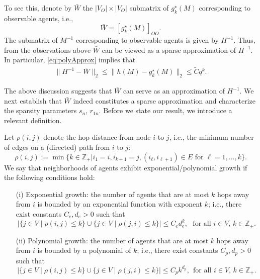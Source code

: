 \documentclass[opre,nonblindrev]{informs3} %
\begin{document}
To see this, denote by  $\bar W$ the $|V_O| \times |V_O|$ submatrix
of $g^\star_k(M)$ corresponding to observable agents, i.e.,
\begin{equation} \label{eq:ex3barW}
\bar W = [g^\star_k(M)]_{OO}.
\end{equation}
The submatrix of $M^{-1}$ corresponding to observable agents is given by $H^{-1}$. Thus, from the observations above $\bar W$ can be viewed as a sparse approximation of $H^{-1}$. In particular, \eqref{eq:polyApprox} implies that
\begin{equation} \label{eq:polyApproxHinv}
\begin{aligned}
\|  H^{-1} - \bar{W}\|_2 \leq
\| h(M) - g_k^\star(M) \|_2
\leq \tilde{C}
q^k.
\end{aligned}
\end{equation}




The above discussion  suggests that $\bar W$ can serve as an approximation  of $H^{-1}$.
We next  establish that
$\bar W$ indeed  constitutes a sparse approximation and characterize the sparsity parameters $s_n$, $r_{1n}$.
Before we state our result, we introduce a relevant definition.

\begin{definition}
	Let  $\rho(i,j)$ denote the hop distance from node $i$ to $j$, i.e.,
	  the minimum number of edges on a (directed) path from $i$ to $j$:
	$$\rho(i,j) :=\min  \{ k\in \mathbb{Z}_{+}|   i_1=i, i_{k+1}=j,  (i_\ell,i_{\ell+1})\in E \mbox{ for $\ell=1,\dots,k$} \}.$$
	We say that neighborhoods
	of  agents
	exhibit exponential/polynomial growth if  the following conditions hold:
	\begin{itemize}
		\item[(i)] Exponential growth: the number of agents that are at most $k$ hops away from $i$ is bounded by an exponential function with exponent $k$; i.e., there exist constants $C_e, d_e>0$ such that 
		$$|\{ j\in V \mid \rho(i,j)  \leq  k \}  \cup \{ j\in V \mid \rho(j,i)  \leq  k \}|  \leq C_e d_e^k, \ \ \ \mbox{for all $i\in V$, $k \in \mathbb{Z}_+$}.$$
		\item[(ii)] 	Polynomial growth:
		the number of agents that are at most  $k$ hops away from $i$
		is bounded by a polynomial of $k$; i.e.,  there exist constants $C_p, d_p>0$ such that
		$$|\{ j\in V \mid \rho(i,j)  \leq  k \} \cup \{ j\in V \mid \rho(j,i)  \leq  k \} | \leq C_p k^{d_p}, \ \ \mbox{for all $i\in V$, $k \in \mathbb{Z}_+$}.$$
	\end{itemize}
\end{definition}
\end{document}
